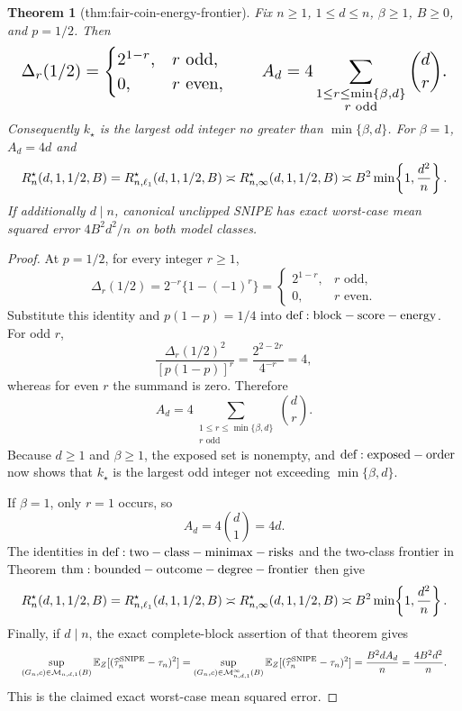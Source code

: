 \documentclass{article}
\newtheorem{theorem}{Theorem}
\begin{document}
\begin{theorem}[thm:fair-coin-energy-frontier]\label{thm:fair-coin-energy-frontier}
Fix \(n\ge1\), \(1\le d\le n\), \(\beta\ge1\), \(B\ge0\), and \(p=1/2\). Then
\[
\makebox[\linewidth][c]{\resizebox{0.98\linewidth}{!}{\(\displaystyle \Delta_r(1/2)=\begin{cases}2^{1-r},&r\text{ odd},\\0,&r\text{ even},\end{cases}
\qquad
A_d=4\sum_{\substack{1\le r\le\min\{\beta,d\}\\r\text{ odd}}}\binom dr.\)}}
\]
Consequently \(k_\star\) is the largest odd integer no greater than \(\min\{\beta,d\}\). For \(\beta=1\), \(A_d=4d\) and
\[
\makebox[\linewidth][c]{\resizebox{0.98\linewidth}{!}{\(\displaystyle R_n^\star(d,1,1/2,B)=R_{n,\ell_1}^\star(d,1,1/2,B)
\asymp R_{n,\infty}^\star(d,1,1/2,B)
\asymp B^2\min\!\left\{1,\frac{d^2}{n}\right\}.\)}}
\]
If additionally \(d\mid n\), canonical unclipped SNIPE has exact worst-case mean squared error \(4B^2d^2/n\) on both model classes.
\end{theorem}
\begin{proof}
At \(p=1/2\), for every integer \(r\ge1\),
\[
\Delta_r(1/2)
=2^{-r}\{1-(-1)^r\}
=\begin{cases}
2^{1-r},&r\text{ odd},\\
0,&r\text{ even}.
\end{cases}
\]
Substitute this identity and \(p(1-p)=1/4\) into \({\rm def:block-score-energy}\). For odd \(r\),
\[
\frac{\Delta_r(1/2)^2}{[p(1-p)]^r}
=\frac{2^{2-2r}}{4^{-r}}=4,
\]
whereas for even \(r\) the summand is zero. Therefore
\[
A_d=4\sum_{\substack{1\le r\le\min\{\beta,d\}\\r\text{ odd}}}\binom dr.
\]
Because \(d\ge1\) and \(\beta\ge1\), the exposed set is nonempty, and \({\rm def:exposed-order}\) now shows that \(k_\star\) is the largest odd integer not exceeding \(\min\{\beta,d\}\).

If \(\beta=1\), only \(r=1\) occurs, so
\[
A_d=4\binom d1=4d.
\]
The identities in \({\rm def:two-class-minimax-risks}\) and the two-class frontier in Theorem \({\rm thm:bounded-outcome-degree-frontier}\) then give
\[
\makebox[\linewidth][c]{\resizebox{0.98\linewidth}{!}{\(\displaystyle R_n^\star(d,1,1/2,B)
=R_{n,\ell_1}^{\star}(d,1,1/2,B)
\asymp R_{n,\infty}^{\star}(d,1,1/2,B)
\asymp B^2\min\!\left\{1,\frac{d^2}{n}\right\}.\)}}
\]
Finally, if \(d\mid n\), the exact complete-block assertion of that theorem gives
\[
\makebox[\linewidth][c]{\resizebox{0.98\linewidth}{!}{\(\displaystyle \sup_{(G_n,c)\in\mathcal M_{n,d,1}(B)}
\mathbb E_Z[(\widehat\tau_n^{\mathrm{SNIPE}}-\tau_n)^2]
=\sup_{(G_n,c)\in\mathcal M_{n,d,1}^{\infty}(B)}
\mathbb E_Z[(\widehat\tau_n^{\mathrm{SNIPE}}-\tau_n)^2]
=\frac{B^2dA_d}{n}
=\frac{4B^2d^2}{n}.\)}}
\]
This is the claimed exact worst-case mean squared error.
\end{proof}
\end{document}
